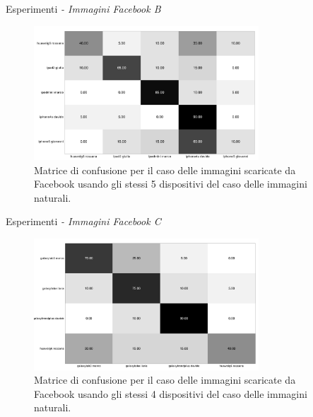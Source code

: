 \begin{tframe}{Esperimenti \emph{- Immagini Facebook B}}

\begin{figure}[h]
\begin{center}
\includegraphics[width=0.75\textwidth]{../images/confusion_matrix_fb_highres_5.png}
\end{center}
  \caption{Matrice di confusione per il caso delle immagini scaricate da Facebook usando gli stessi 5 dispositivi del caso delle immagini naturali.}
\label{fig:validation}
\end{figure}

\end{tframe}

\begin{tframe}{Esperimenti \emph{- Immagini Facebook C}}

\begin{figure}[h]
\begin{center}
\includegraphics[width=0.75\textwidth]{../images/confusion_matrix_fb_highres_4.png}
\end{center}
  \caption{Matrice di confusione per il caso delle immagini scaricate da Facebook usando gli stessi 4 dispositivi del caso delle immagini naturali. }
\label{fig:validation}
\end{figure}

\end{tframe}

